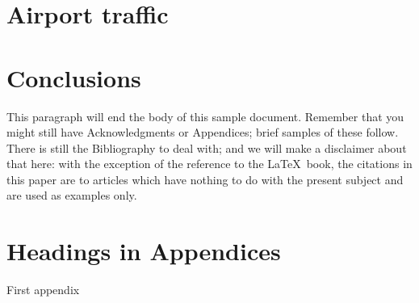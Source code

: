 \documentclass{acm_proc_article-sp-sigmod09}
\begin{document}
\section{Airport traffic}

\section{Conclusions}
This paragraph will end the body of this sample document.
Remember that you might still have Acknowledgments or
Appendices; brief samples of these
follow.  There is still the Bibliography to deal with; and
we will make a disclaimer about that here: with the exception
of the reference to the \LaTeX\ book, the citations in
this paper are to articles which have nothing to
do with the present subject and are used as
examples only.


%




\balancecolumns
\appendix
\section{Headings in Appendices}
First appendix
\end{document}
